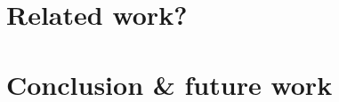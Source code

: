 \documentclass[
twocolumn,
]{ceurart}
\begin{document}

\section{Related work?}

\section{Conclusion \& future work}



\end{document}
